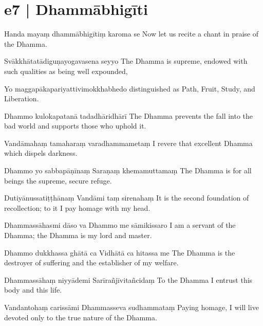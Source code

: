 \section*{e7 | Dhammābhigīti}

\begin{chantsubsection}
  \chantline
    {Handa mayaṃ dhammābhigītiṃ karoma se}
    {Now let us recite a chant in praise of the Dhamma.}

  \chantline
    {Svākkhātatādiguṇayogavasena seyyo}
    {The Dhamma is supreme, endowed with such qualities as being well expounded,}

  \chantline
    {Yo maggapākapariyattivimokkhabhedo}
    {distinguished as Path, Fruit, Study, and Liberation.}

  \chantline
    {Dhammo kulokapatanā tadadhāridhārī}
    {The Dhamma prevents the fall into the bad world and supports those who uphold it.}

  \chantline
    {Vandāmahaṃ tamaharaṃ varadhammametaṃ}
    {I revere that excellent Dhamma which dispels darkness.}

  \chantlinepair
    {Dhammo yo sabbapāṇīnaṃ}
    {Saraṇaṃ khemamuttamaṃ}
    {The Dhamma is for all beings the supreme, secure refuge.}

  \chantlinepair
    {Dutiyānussatiṭṭhānaṃ}
    {Vandāmi taṃ sirenahaṃ}
    {It is the second foundation of recollection; to it I pay homage with my head.}

  \chantlinepair
    {Dhammassāhasmi dāso\footnotemark{} va}
    {Dhammo me sāmikissaro}
    {I am a servant of the Dhamma; the Dhamma is my lord and master.}

  \chantlinepair
    {Dhammo dukkhassa ghātā ca}
    {Vidhātā ca hitassa me}
    {The Dhamma is the destroyer of suffering and the establisher of my welfare.}

  \chantlinepair
    {Dhammassāhaṃ niyyādemi}
    {Sarīrañjīvitañcidaṃ}
    {To the Dhamma I entrust this body and this life.}

  \chantlinepair
    {Vandantohaṃ\footnotemark{} carissāmi}
    {Dhammasseva sudhammataṃ}
    {Paying homage, I will live devoted only to the true nature of the Dhamma.}


\end{chantsubsection}
